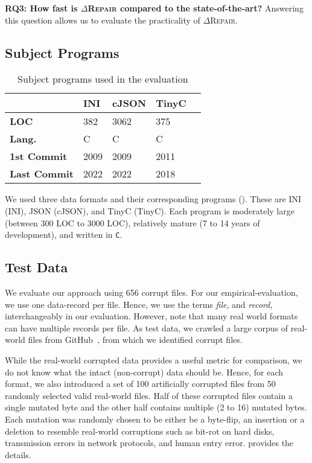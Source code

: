 \documentclass[acmsmall,screen,review,anonymous]{acmart}
\newcommand{\approach}{\textsc{$\Delta$Repair}\xspace}
\newcommand{\drepair}{\approach}
\def\<#1>{\texttt{#1}}
\begin{document}
\noindent\textbf{RQ3: How fast is \drepair compared to the state-of-the-art?}
Answering this question allows us to evaluate the practicality of \drepair.


\subsection{Subject Programs} %
\begin{table}[!tbp]\centering
\caption{Subject programs used in the evaluation}
\begin{tabular}{|p{4cm}|p{2cm}|p{2cm}|p{2cm}|p{2cm}|}
\hline
\textbf{} & \textbf{INI} & \textbf{cJSON} & \textbf{TinyC} \\
\hline
\textbf{LOC} & 382 & 3062 & 375\\
\textbf{Lang.} & C & C & C \\
\textbf{1st Commit} & 2009 & 2009 & 2011\\
\textbf{Last Commit} & 2022 & 2022 & 2018\\
\hline
\end{tabular}
\label{tab:subjectprograms}
\end{table}

We used three data formats and their corresponding programs (). These are INI (INI), JSON (cJSON), and TinyC (TinyC). Each program is moderately large (between 300 LOC to 3000 LOC), relatively mature (7 to 14 years of development), and written in \<C>.

\subsection{Test Data} 

We evaluate our approach using 656 corrupt files.
For our empirical-evaluation, we use one data-record per file. Hence, we use
the terms \emph{file}, and \emph{record}, interchangeably in our evaluation.
However, note that many real world formats can have multiple records per file.
As test data, we crawled a large corpus of real-world files
from GitHub~\cite{githubapi}, from which we identified corrupt files. 

While the real-world corrupted data provides a useful metric for comparison,
we do not know what the intact (non-corrupt) data should be. Hence,
for each format, we also introduced a set of 100 artificially corrupted
files from 50 randomly selected valid real-world files.
Half of these corrupted files contain a single mutated byte and the other half
contains multiple (2 to 16) mutated bytes.
Each mutation was randomly chosen to be either be a byte-flip, an insertion or a
deletion to resemble real-world corruptions such as bit-rot on hard disks,
transmission errors in network protocols, and human entry error.
 provides the details.
\end{document}
